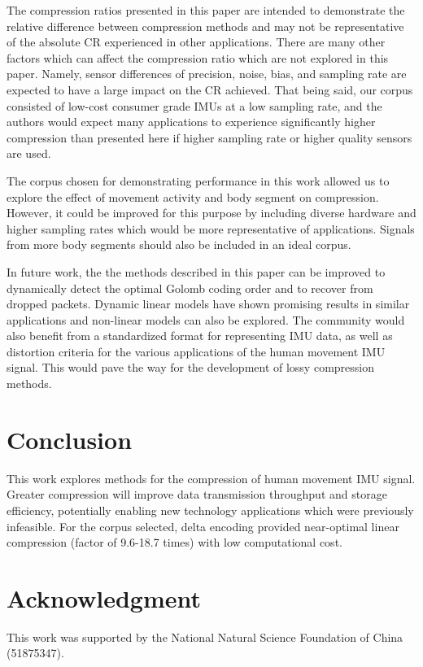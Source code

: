 \documentclass[journal]{IEEEtran}
\begin{document}
The compression ratios presented in this paper are intended to demonstrate the relative difference between compression methods and may not be representative of the absolute CR experienced in other applications. There are many other factors which can affect the compression ratio which are not explored in this paper. Namely, sensor differences of precision, noise, bias, and sampling rate are expected to have a large impact on the CR achieved. That being said, our corpus consisted of low-cost consumer grade IMUs at a low sampling rate, and the authors would expect many applications to experience significantly higher compression than presented here if higher sampling rate or higher quality sensors are used.

The corpus chosen for demonstrating performance in this work allowed us to explore the effect of movement activity and body segment on compression. However, it could be improved for this purpose by including diverse hardware and higher sampling rates which would be more representative of applications. Signals from more body segments should also be included in an ideal corpus.

In future work, the the methods described in this paper can be improved to dynamically detect the optimal Golomb coding order and to recover from dropped packets. Dynamic linear models have shown promising results in similar applications \cite{Blalock2018} and non-linear models can also be explored. The community would also benefit from a standardized format for representing IMU data, as well as distortion criteria for the various applications of the human movement IMU signal. This would pave the way for the development of lossy compression methods.


\section{Conclusion}
This work explores methods for the compression of human movement IMU signal. Greater compression will improve data transmission throughput and storage efficiency, potentially enabling new technology applications which were previously infeasible. For the corpus selected, delta encoding provided near-optimal linear compression (factor of 9.6-18.7 times) with low computational cost.

\section*{Acknowledgment}
This work was supported by the National Natural Science
Foundation of China (51875347).
\end{document}
